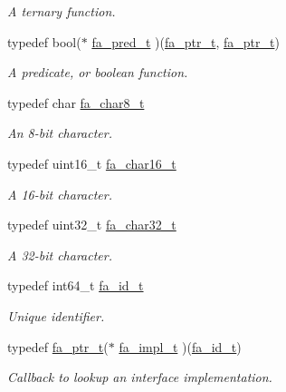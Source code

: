 \begin{DoxyCompactItemize}
\begin{DoxyCompactList}\small\item\em A ternary function. \end{DoxyCompactList}\item 
typedef bool($\ast$ \hyperlink{group___fa_gae6b6ae9fb073db0ba0bd323d511c6a98}{fa\-\_\-pred\-\_\-t} )(\hyperlink{group___fa_ga915ddeae99ad7568b273d2b876425197}{fa\-\_\-ptr\-\_\-t}, \hyperlink{group___fa_ga915ddeae99ad7568b273d2b876425197}{fa\-\_\-ptr\-\_\-t})
\begin{DoxyCompactList}\small\item\em A predicate, or boolean function. \end{DoxyCompactList}\item 
typedef char \hyperlink{group___fa_ga98bfdb5d0438f95f3438cddeab1818e8}{fa\-\_\-char8\-\_\-t}
\begin{DoxyCompactList}\small\item\em An 8-\/bit character. \end{DoxyCompactList}\item 
typedef uint16\-\_\-t \hyperlink{group___fa_ga33e83372a0abc1895fdad5fb4d15eae3}{fa\-\_\-char16\-\_\-t}
\begin{DoxyCompactList}\small\item\em A 16-\/bit character. \end{DoxyCompactList}\item 
typedef uint32\-\_\-t \hyperlink{group___fa_gaca70e02afbba75b08b2b6531b821f67b}{fa\-\_\-char32\-\_\-t}
\begin{DoxyCompactList}\small\item\em A 32-\/bit character. \end{DoxyCompactList}\item 
typedef int64\-\_\-t \hyperlink{group___fa_gaeb5011c69dfea4d2c41c05a2c95899d0}{fa\-\_\-id\-\_\-t}
\begin{DoxyCompactList}\small\item\em Unique identifier. \end{DoxyCompactList}\item 
typedef \hyperlink{group___fa_ga915ddeae99ad7568b273d2b876425197}{fa\-\_\-ptr\-\_\-t}($\ast$ \hyperlink{group___fa_gac13cc6d4ef02b8763045164333cfd763}{fa\-\_\-impl\-\_\-t} )(\hyperlink{group___fa_gaeb5011c69dfea4d2c41c05a2c95899d0}{fa\-\_\-id\-\_\-t})
\begin{DoxyCompactList}\small\item\em Callback to lookup an interface implementation. \end{DoxyCompactList}\end{DoxyCompactItemize}
